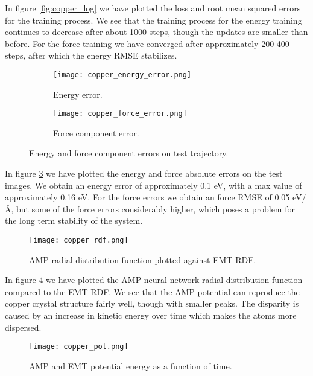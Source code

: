 In figure \ref{fig:copper_log} we have plotted the loss and root mean
squared errors for the training process.
We see that the training process for the energy training
continues to decrease after about 1000 steps, though
the updates are smaller than before.
For the force training we have converged after
approximately 200-400 steps, after which the energy RMSE
stabilizes.

\begin{figure}[H]
\begin{adjustbox}{max width=1.2\linewidth,center}
\centering
  \begin{subfigure}[b]{0.55\textwidth}
      \texttt{[image: copper\_energy\_error.png]}
      \caption{Energy error.}
    \label{fig:f1}
  \end{subfigure}
  \hfill
  \begin{subfigure}[b]{0.55\textwidth}
      \texttt{[image: copper\_force\_error.png]}
      \caption{Force component error.}
    \label{fig:f2}
  \end{subfigure}
\end{adjustbox}
    \caption{Energy and force component errors on test trajectory.}
    \label{fig:copper_error}
\end{figure}

In figure \ref{fig:copper_error} we have plotted the energy and force
absolute errors on the test images. We obtain an energy error
of approximately 0.1 eV, with a max value of approximately 0.16 eV.
For the force errors we obtain an force RMSE of 0.05 eV/Å,
but some of the force errors considerably higher, which poses
a problem for the long term stability of the system.

\begin{figure}[H]
    \centering
    \texttt{[image: copper\_rdf.png]}
    \caption{AMP radial distribution function plotted against
        EMT RDF.}
    \label{fig:copper-rdf}
\end{figure}

In figure \ref{fig:copper-rdf} we have plotted the AMP neural network
radial distribution function compared to the EMT RDF.
We see that the AMP potential can reproduce the copper crystal
structure fairly well, though with smaller peaks.
The disparity is caused by an increase in kinetic energy over time
which makes the atoms more dispersed.

\begin{figure}[H]
    \centering
    \texttt{[image: copper\_pot.png]}
    \caption{AMP and EMT potential energy as a function of time.}
    \label{fig:copper-pot}
\end{figure}

